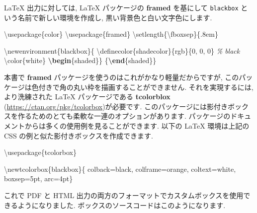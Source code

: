 \documentclass[
  11pt,
  lualatex,ja=standard,jafont=noto]{bxjsreport}
\newenvironment{Shaded}{\begin{snugshade}}{\end{snugshade}}
\newcommand{\BuiltInTok}[1]{#1}
\newcommand{\CommentTok}[1]{\textcolor[rgb]{0.56,0.35,0.01}{\textit{#1}}}
\newcommand{\ExtensionTok}[1]{#1}
\newcommand{\FunctionTok}[1]{\textcolor[rgb]{0.00,0.00,0.00}{#1}}
\newcommand{\KeywordTok}[1]{\textcolor[rgb]{0.13,0.29,0.53}{\textbf{#1}}}
\newcommand{\NormalTok}[1]{#1}
\begin{document}
LaTeX 出力に対しては, LaTeX パッケージの \textbf{framed} を基にして \texttt{blackbox} という名前で新しい環境を作成し, 黒い背景色と白い文字色にします.

\begin{Shaded}
\begin{Highlighting}[numbers=left,,]
\BuiltInTok{\textbackslash{}usepackage}\NormalTok{\{}\ExtensionTok{color}\NormalTok{\}}
\BuiltInTok{\textbackslash{}usepackage}\NormalTok{\{}\ExtensionTok{framed}\NormalTok{\}}
\FunctionTok{\textbackslash{}setlength}\NormalTok{\{}\FunctionTok{\textbackslash{}fboxsep}\NormalTok{\}\{.8em\}}

\FunctionTok{\textbackslash{}newenvironment}\NormalTok{\{blackbox\}\{}
  \FunctionTok{\textbackslash{}definecolor}\NormalTok{\{shadecolor\}\{rgb\}\{0, 0, 0\}  }\CommentTok{\% black}
  \FunctionTok{\textbackslash{}color}\NormalTok{\{white\}}
  \KeywordTok{\textbackslash{}begin}\NormalTok{\{}\ExtensionTok{shaded}\NormalTok{\}\}}
\NormalTok{ \{}\KeywordTok{\textbackslash{}end}\NormalTok{\{}\ExtensionTok{shaded}\NormalTok{\}\}}
\end{Highlighting}
\end{Shaded}

本書で \textbf{framed} パッケージを使うのはこれがかなり軽量だからですが, このパッケージは色付きで角の丸い枠を描画することができません. それを実現するには, より洗練された LaTeX パッケージである \textbf{tcolorblox} (\url{https://ctan.org/pkg/tcolorbox})が必要です. このパッケージには影付きボックスを作るためのとても柔軟な一連のオプションがあります. パッケージのドキュメントからは多くの使用例を見ることができます. 以下の LaTeX 環境は上記の CSS の例と似た影付きボックスを作成できます.

\begin{Shaded}
\begin{Highlighting}[]
\BuiltInTok{\textbackslash{}usepackage}\NormalTok{\{}\ExtensionTok{tcolorbox}\NormalTok{\}}

\FunctionTok{\textbackslash{}newtcolorbox}\NormalTok{\{blackbox\}\{}
\NormalTok{  colback=black,}
\NormalTok{  colframe=orange,}
\NormalTok{  coltext=white,}
\NormalTok{  boxsep=5pt,}
\NormalTok{  arc=4pt\}}
\end{Highlighting}
\end{Shaded}

これで PDF と HTML 出力の両方のフォーマットでカスタムボックスを使用できるようになりました. ボックスのソースコードはこのようになります.
\end{document}
